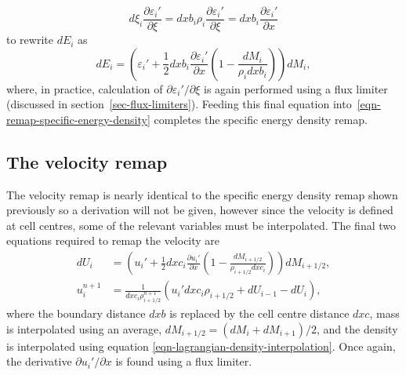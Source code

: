 \begin{equation}
  d\xi_i \frac{\partial \varepsilon_i'}{\partial \xi} = dxb_i\rho_i \frac{\partial \varepsilon_i'}{\partial \xi} = dxb_i \frac{\partial \varepsilon_i'}{\partial x}
\end{equation}
to rewrite $dE_i$ as
\begin{equation}
  dE_i = \left( \varepsilon_i' + \frac{1}{2}dxb_i\frac{\partial \varepsilon_i'}{\partial x} \left( 1 - \frac{dM_i}{\rho_i dxb_i} \right) \right)dM_i,
  \label{eqn-remap-energy-difference}
\end{equation}
where, in practice, calculation of $\partial \varepsilon_i'/\partial\xi$ is again performed using a flux limiter (discussed in section~\ref{sec-flux-limiters}). Feeding this final equation into~\eqref{eqn-remap-specific-energy-density} completes the specific energy density remap.

\subsection{The velocity remap}
\label{sec-remap-velocity}
The velocity remap is nearly identical to the specific energy density remap shown previously so a derivation will not be given, however since the velocity is defined at cell centres, some of the relevant variables must be interpolated. The final two equations required to remap the velocity are 
\begin{align}
  dU_i &= \left( u_i' + \frac{1}{2}dxc_i\frac{\partial u_i'}{\partial x} \left( 1 - \frac{dM_{i+1/2}}{\rho_{i+1/2} dxc_i} \right) \right)dM_{i+1/2},\\
  u_i^{n+1}  &= \frac{1}{dxc_i \rho_{i+1/2}^{n+1}}(u_i' dxc_i \rho_{i+1/2} + dU_{i-1} - dU_i),
\end{align}
where the boundary distance $dxb$ is replaced by the cell centre distance $dxc$, mass is interpolated using an average, $dM_{i+1/2} = (dM_{i} + dM_{i+1})/2$, and the density is interpolated using equation \eqref{eqn-lagrangian-density-interpolation}. Once again, the derivative $\partial u_i' / \partial x$ is found using a flux limiter. 

